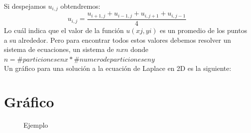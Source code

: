 \documentclass[a4paper,10pt]{article}
\begin{document}
Si despejamos $ u_{i,j}$ obtendremos:
$$ u_{i,j}  = \frac{u_{i+1,j} + u_{i-1,j}+ u_{i,j+1}+ u_{i,j-1}}{4} $$
Lo cuál indica que el valor de la función $u(xj,yi)$  es un promedio de los puntos a su alrededor. 
Pero para encontrar todos estos valores
debemos resolver un sistema de ecuaciones, un sistema de $ n x n $ donde $n = \# particiones en x  * \# numero de particiones en y $
\\
Un gráfico para una solución a la ecuación de Laplace en 2D es la siguiente:
\section{Gráfico}

\begin{figure}[htb]
\centering
  \caption{Ejemplo}
\end{figure}
\end{document}
